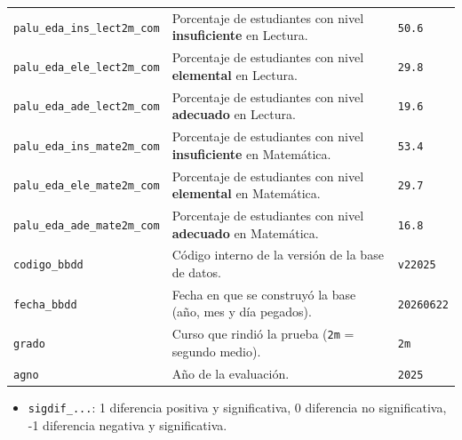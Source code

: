 \documentclass[10.5pt]{article}
\begin{document}
\begin{xltabular}{\linewidth}{@{}p{4.5cm} >{\raggedright\arraybackslash}X p{3.4cm}@{}}
\texttt{palu\_\allowbreak{}eda\_\allowbreak{}ins\_\allowbreak{}lect2m\_\allowbreak{}com} & Porcentaje de estudiantes con nivel \textbf{insuficiente} en Lectura. & \texttt{50.6} \\
\texttt{palu\_\allowbreak{}eda\_\allowbreak{}ele\_\allowbreak{}lect2m\_\allowbreak{}com} & Porcentaje de estudiantes con nivel \textbf{elemental} en Lectura. & \texttt{29.8} \\
\texttt{palu\_\allowbreak{}eda\_\allowbreak{}ade\_\allowbreak{}lect2m\_\allowbreak{}com} & Porcentaje de estudiantes con nivel \textbf{adecuado} en Lectura. & \texttt{19.6} \\
\texttt{palu\_\allowbreak{}eda\_\allowbreak{}ins\_\allowbreak{}mate2m\_\allowbreak{}com} & Porcentaje de estudiantes con nivel \textbf{insuficiente} en Matemática. & \texttt{53.4} \\
\texttt{palu\_\allowbreak{}eda\_\allowbreak{}ele\_\allowbreak{}mate2m\_\allowbreak{}com} & Porcentaje de estudiantes con nivel \textbf{elemental} en Matemática. & \texttt{29.7} \\
\texttt{palu\_\allowbreak{}eda\_\allowbreak{}ade\_\allowbreak{}mate2m\_\allowbreak{}com} & Porcentaje de estudiantes con nivel \textbf{adecuado} en Matemática. & \texttt{16.8} \\
\texttt{codigo\_\allowbreak{}bbdd} & Código interno de la versión de la base de datos. & \texttt{v22025} \\
\texttt{fecha\_\allowbreak{}bbdd} & Fecha en que se construyó la base (año, mes y día pegados). & \texttt{20260622} \\
\texttt{grado} & Curso que rindió la prueba (\texttt{2m} = segundo medio). & \texttt{2m} \\
\texttt{agno} & Año de la evaluación. & \texttt{2025} \\
\end{xltabular}

\begin{formulabox}
\begin{itemize}[leftmargin=1.1em,itemsep=2pt,topsep=2pt]
\item \texttt{sigdif\_\allowbreak{}...}: 1 diferencia positiva y significativa, 0 diferencia no significativa, -1 diferencia negativa y significativa.
\end{itemize}
\end{formulabox}
\end{document}
